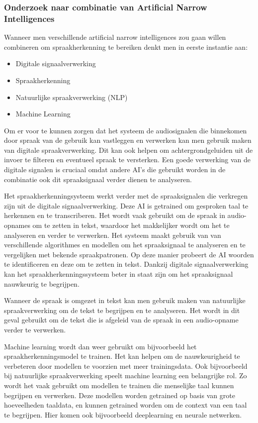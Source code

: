 \subsubsection{Onderzoek naar combinatie van Artificial Narrow Intelligences}

Wanneer men verschillende artificial narrow intelligences zou gaan willen combineren om spraakherkenning te bereiken denkt men in eerste instantie aan:

\begin{itemize}
    \item Digitale signaalverwerking
    \item Spraakherkenning
    \item Natuurlijke spraakverwerking (NLP)
    \item Machine Learning
\end{itemize}

Om er voor te kunnen zorgen dat het systeem de audiosignalen die binnekomen door spraak van de gebruik kan vastleggen en verwerken kan men gebruik maken van digitale spraakverwerking. Dit kan ook helpen om achtergrondgeluiden uit de invoer te filteren en eventueel spraak te versterken. Een goede verwerking van de digitale signalen is cruciaal omdat andere AI's die gebruikt worden in de combinatie ook dit spraaksignaal verder dienen te analyseren.

Het spraakherkenningsysteem werkt verder met de spraaksignalen die verkregen zijn uit de digitale signaalverwerking. Deze AI is getrained om gesproken taal te herkennen en te transcriberen. Het wordt vaak gebruikt om de spraak in audio-opnames om te zetten in tekst, waardoor het makkelijker wordt om het te analyseren en verder te verwerken. Het systeem maakt gebruik van van verschillende algorithmes en modellen om het spraaksignaal te analyseren en te vergelijken met bekende spraakpatronen. Op deze manier probeert de AI woorden te identificeren en deze om te zetten in tekst. Dankzij digitale signaalverwerking kan het spraakherkenningssysteem beter in staat zijn om het spraaksignaal nauwkeurig te begrijpen.

Wanneer de spraak is omgezet in tekst kan men gebruik maken van natuurlijke spraakverwerking om de tekst te begrijpen en te analyseren. Het wordt in dit geval gebruikt om de tekst die is afgeleid van de spraak in een audio-opname verder te verwerken.

Machine learning wordt dan weer gebruikt om bijvoorbeeld het spraakherkenningsmodel te trainen. Het kan helpen om de nauwkeurigheid te verbeteren door modellen te voorzien met meer trainingsdata. Ook bijvoorbeeld bij natuurlijke spraakverwerking speelt machine learning een belangrijke rol. Zo wordt het vaak gebruikt om modellen te trainen die menselijke taal kunnen begrijpen en verwerken. Deze modellen worden getrained op basis van grote hoeveelheden taaldata, en kunnen getrained worden om de context van een taal te begrijpen. Hier komen ook bijvoorbeeld deeplearning en neurale netwerken.

